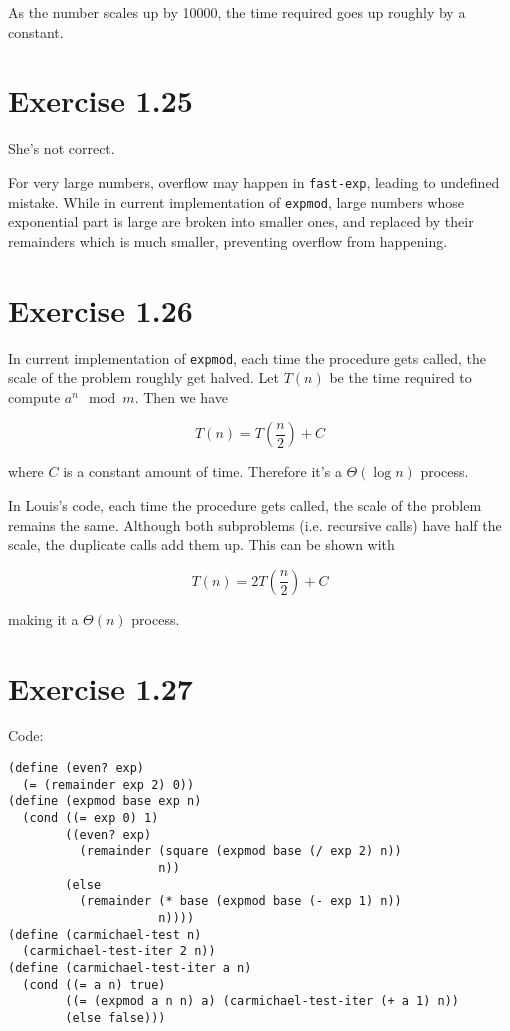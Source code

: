 \documentclass[../main.tex]{subfiles}
\begin{document}
As the number scales up by 10000, the time required
 goes up roughly by a constant.

\section{Exercise 1.25}

She's not correct.

For very large numbers, overflow may happen in \lstinline{fast-exp}, leading to undefined mistake.
 While in current implementation of \lstinline{expmod}, large numbers whose exponential part is
 large are broken into smaller ones, and replaced by their remainders which is much smaller, preventing
 overflow from happening.

\section{Exercise 1.26}

In current implementation of \lstinline{expmod}, each time the procedure gets called, the scale of the
 problem roughly get halved. Let $T(n)$ be the time required to compute $a^n \mod m$. Then we have

$$
T(n) = T\left(\frac{n}{2}\right) + C
$$

where $C$ is a constant amount of time. Therefore it's a $\Theta(\log n)$ process.

In Louis's code, each time the procedure gets called, the scale of the problem remains the same. Although
 both subproblems (i.e. recursive calls) have half the scale, the duplicate calls add them up.
 This can be shown with

$$
T(n) = 2T\left(\frac{n}{2}\right) + C
$$

making it a $\Theta(n)$ process.

\section{Exercise 1.27}

Code:

\begin{lstlisting}
(define (even? exp)
  (= (remainder exp 2) 0))
(define (expmod base exp n)
  (cond ((= exp 0) 1)
        ((even? exp)
          (remainder (square (expmod base (/ exp 2) n)) 
                     n))
        (else
          (remainder (* base (expmod base (- exp 1) n))
                     n))))
(define (carmichael-test n)
  (carmichael-test-iter 2 n))
(define (carmichael-test-iter a n)
  (cond ((= a n) true)
        ((= (expmod a n n) a) (carmichael-test-iter (+ a 1) n))
        (else false)))
\end{lstlisting}
\end{document}
